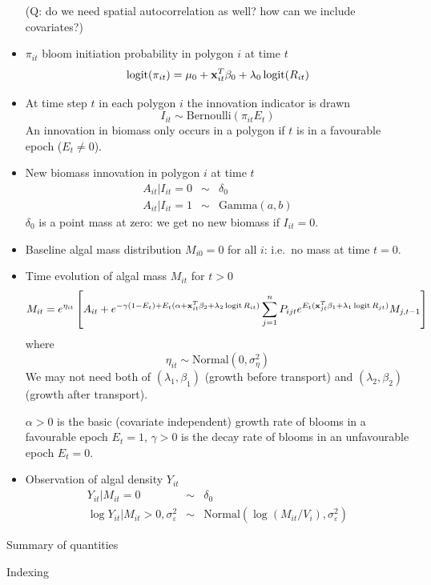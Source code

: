 \documentclass[
]{article}
\DeclareMathOperator*{\logit}{logit}
\begin{document}
\begin{itemize}
  (Q: do we need spatial autocorrelation as well? how can we include
  covariates?)
\item
  \(\pi_{it}\) bloom initiation probability in polygon \(i\) at time
  \(t\) \[
     \logit(\pi_{it}) = \mu_0 + {\bf x}_{it}^T{\beta}_0 + \lambda_0 \logit(R_{it})
  \]
\item
  At time step \(t\) in each polygon \(i\) the innovation indicator is
  drawn \[
     I_{it} \sim \text{Bernoulli}(\pi_{it}E_t)
  \] An innovation in biomass only occurs in a polygon if \(t\) is in a
  favourable epoch (\(E_t\neq 0\)).
\item
  New biomass innovation in polygon \(i\) at time \(t\)
  \begin{eqnarray*}
     A_{it} | I_{it}=0 &\sim& \delta_0\\
     A_{it} | I_{it}=1 &\sim& \text{Gamma}(a,b)
  \end{eqnarray*} \(\delta_0\) is a point mass at zero: we get no new
  biomass if \(I_{it}=0\).
\item
  Baseline algal mass distribution \(M_{i0}=0\) for all \(i\): i.e.~no
  mass at time \(t=0\).
\item
  Time evolution of algal mass \(M_{it}\) for \(t>0\) \[
     M_{it} = e^{\eta_{it}}\left[
              A_{it} + e^{-\gamma (1-E_t) + E_t(\alpha + {\bf x}_{it}^T{\beta}_2 + \lambda_2 \logit R_{it})}
                       \sum_{j=1}^n P_{ijt} 
                                    e^{E_t({\bf x}_{jt}^T{\beta}_1 + \lambda_1 \logit R_{jt})}
                                    M_{j,t-1}
              \right]
  \] where \[
     \eta_{it} \sim \text{Normal}(0,\sigma^2_\eta)
  \] We may not need both of \(({\lambda_1,\beta}_1)\) (growth before
  transport) and \((\lambda_2,{\beta}_2)\) (growth after transport).

  \(\alpha>0\) is the basic (covariate independent) growth rate of
  blooms in a favourable epoch \(E_t=1\), \(\gamma>0\) is the decay rate
  of blooms in an unfavourable epoch \(E_t=0\).
\item
  Observation of algal density \(Y_{it}\) \begin{eqnarray*}
    Y_{it} | M_{it} = 0 &\sim& \delta_0\\
    \log Y_{it} | M_{it}>0, \sigma_\varepsilon^2 &\sim& \text{Normal}(\log (M_{it}/V_i),
    \sigma_\varepsilon^2)
  \end{eqnarray*}
\end{itemize}

Summary of quantities

Indexing
\end{document}
